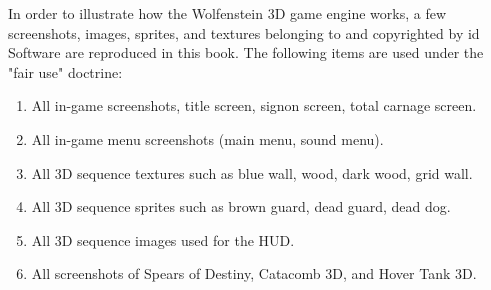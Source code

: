In order to illustrate how the Wolfenstein 3D game engine works, a few screenshots, images, sprites, and textures belonging to and copyrighted by id Software are reproduced in this book. The following items are used under the "fair use" doctrine:\\
\par
\begin{enumerate}
	\item All in-game screenshots, title screen, signon screen, total carnage screen.
	\item All in-game menu screenshots (main menu, sound menu).
	\item All 3D sequence textures such as blue wall, wood, dark wood, grid wall.
    \item All 3D sequence sprites such as brown guard, dead guard, dead dog.
    \item All 3D sequence images used for the HUD.
    \item All screenshots of Spears of Destiny, Catacomb 3D, and Hover Tank 3D.
\end{enumerate}
